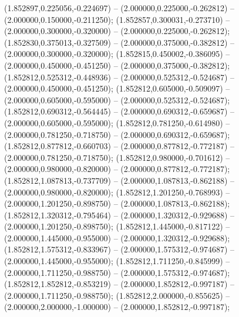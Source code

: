  (1.852897,0.225056,-0.224697) -- (2.000000,0.225000,-0.262812) -- (2.000000,0.150000,-0.211250);
 (1.852857,0.300031,-0.273710) -- (2.000000,0.300000,-0.320000) -- (2.000000,0.225000,-0.262812);
 (1.852830,0.375013,-0.327509) -- (2.000000,0.375000,-0.382812) -- (2.000000,0.300000,-0.320000);
 (1.852815,0.450002,-0.386095) -- (2.000000,0.450000,-0.451250) -- (2.000000,0.375000,-0.382812);
 (1.852812,0.525312,-0.448936) -- (2.000000,0.525312,-0.524687) -- (2.000000,0.450000,-0.451250);
 (1.852812,0.605000,-0.509097) -- (2.000000,0.605000,-0.595000) -- (2.000000,0.525312,-0.524687);
 (1.852812,0.690312,-0.564445) -- (2.000000,0.690312,-0.659687) -- (2.000000,0.605000,-0.595000);
 (1.852812,0.781250,-0.614980) -- (2.000000,0.781250,-0.718750) -- (2.000000,0.690312,-0.659687);
 (1.852812,0.877812,-0.660703) -- (2.000000,0.877812,-0.772187) -- (2.000000,0.781250,-0.718750);
 (1.852812,0.980000,-0.701612) -- (2.000000,0.980000,-0.820000) -- (2.000000,0.877812,-0.772187);
 (1.852812,1.087813,-0.737709) -- (2.000000,1.087813,-0.862188) -- (2.000000,0.980000,-0.820000);
 (1.852812,1.201250,-0.768993) -- (2.000000,1.201250,-0.898750) -- (2.000000,1.087813,-0.862188);
 (1.852812,1.320312,-0.795464) -- (2.000000,1.320312,-0.929688) -- (2.000000,1.201250,-0.898750);
 (1.852812,1.445000,-0.817122) -- (2.000000,1.445000,-0.955000) -- (2.000000,1.320312,-0.929688);
 (1.852812,1.575312,-0.833967) -- (2.000000,1.575312,-0.974687) -- (2.000000,1.445000,-0.955000);
 (1.852812,1.711250,-0.845999) -- (2.000000,1.711250,-0.988750) -- (2.000000,1.575312,-0.974687);
 (1.852812,1.852812,-0.853219) -- (2.000000,1.852812,-0.997187) -- (2.000000,1.711250,-0.988750);
 (1.852812,2.000000,-0.855625) -- (2.000000,2.000000,-1.000000) -- (2.000000,1.852812,-0.997187);

